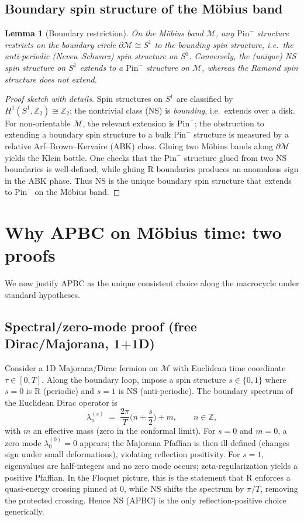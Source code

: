 \documentclass[aps,prb,twocolumn,superscriptaddress,nofootinbib,10pt]{revtex4-2}
\newtheorem{lemma}{Lemma}
\theoremstyle{definition}
\theoremstyle{remark}
\newcommand{\Z}{\mathbb{Z}}
\newcommand{\Pin}{\mathrm{Pin}}
\begin{document}
\subsection{Boundary spin structure of the M\"obius band}
\begin{lemma}[Boundary restriction]\label{lem:boundary}
On the M\"obius band $\mathcal{M}$, any $\Pin^{-}$ structure restricts on the boundary circle $\partial\mathcal{M}\cong S^1$
to the \emph{bounding} spin structure, i.e.\ the \emph{anti-periodic} (Neveu--Schwarz) spin structure on $S^1$.
Conversely, the (unique) NS spin structure on $S^1$ extends to a $\Pin^{-}$ structure on $\mathcal{M}$, whereas the Ramond
spin structure does \emph{not} extend.
\end{lemma}
\begin{proof}[Proof sketch with details]
Spin structures on $S^1$ are classified by $H^1(S^1,\Z_2)\cong \Z_2$; the nontrivial class (NS) is \emph{bounding}, i.e.\ extends
over a disk. For non-orientable $\mathcal{M}$, the relevant extension is $\Pin^{-}$; the obstruction to extending a boundary spin
structure to a bulk $\Pin^{-}$ structure is measured by a relative Arf--Brown--Kervaire (ABK) class. Gluing two M\"obius bands
along $\partial\mathcal{M}$ yields the Klein bottle. One checks that the $\Pin^{-}$ structure glued from two NS boundaries is
well-defined, while gluing R boundaries produces an anomalous sign in the ABK phase. Thus NS is the unique boundary spin structure
that extends to $\Pin^{-}$ on the M\"obius band.
\end{proof}

\section{Why APBC on M\"obius time: two proofs}
We now justify APBC as the unique consistent choice along the macrocycle under standard hypotheses.

\subsection{Spectral/zero-mode proof (free Dirac/Majorana, 1+1D)}\label{subsec:spectral}
Consider a 1D Majorana/Dirac fermion on $\mathcal{M}$ with Euclidean time coordinate $\tau\in[0,T]$. Along the boundary loop,
impose a spin structure $s\in\{0,1\}$ where $s=0$ is R (periodic) and $s=1$ is NS (anti-periodic). The boundary spectrum of the
Euclidean Dirac operator is
\begin{equation}
\lambda_n^{(s)} \;=\; \frac{2\pi}{T}\Big(n+\frac{s}{2}\Big)+m,\qquad n\in\Z,
\end{equation}
with $m$ an effective mass (zero in the conformal limit). For $s=0$ and $m=0$, a zero mode $\lambda_0^{(0)}=0$ appears; the
Majorana Pfaffian is then ill-defined (changes sign under small deformations), violating reflection positivity. For $s=1$,
eigenvalues are half-integers and no zero mode occurs; zeta-regularization yields a positive Pfaffian. In the Floquet picture,
this is the statement that R enforces a quasi-energy crossing pinned at $0$, while NS shifts the spectrum by $\pi/T$, removing
the protected crossing. Hence NS (APBC) is the only reflection-positive choice generically.
\end{document}
